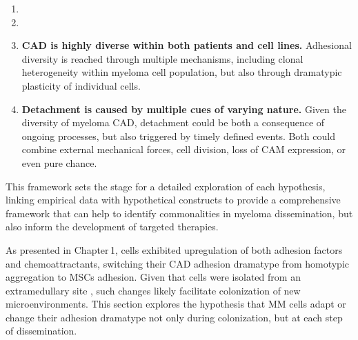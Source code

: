 \newcommand{\cadddiversity}{%
      \textbf{\ac{CAD} is highly diverse within both patients and cell lines.}
      Adhesional diversity is reached through multiple mechanisms, including
      clonal heterogeneity within myeloma cell population, but also through
      dramatypic plasticity of individual cells.%
}%
\newcommand{\cadddiversitytitle}{ %
      \textit{Hypothesis 3}: CAD is Highly Diverse Within both Patients
      and Cell Lines%
}%


\newcommand{\caddtrigger}{%
      \textbf{Detachment is caused by multiple cues of varying nature.} Given
      the diversity of myeloma \ac{CAD}, detachment could be both a consequence
      of ongoing processes, but also triggered by timely defined events. Both
      could combine external mechanical forces, cell division, loss
      of \ac{CAM} expression, or even pure chance. }%
\newcommand{\caddtriggertitle}{ %
      \textit{Hypothesis 4}: Detachment is Caused by Multiple Cues of Varying
      Nature %
}%



\begin{enumerate}[parsep=4pt]
      \item \caddramatype
      \item \cadplasticity
      \item \cadddiversity
      \item \caddtrigger
\end{enumerate}


This framework sets the stage for a detailed exploration of each hypothesis,
linking empirical data with hypothetical constructs to provide a comprehensive
framework that can help to identify commonalities in myeloma dissemination, but
also inform the development of targeted therapies.




\unnsubsection{\caddramatypetitle}%
\label{sec:discussion_caddadaptation}%
As presented in Chapter\,1, \MAina cells exhibited upregulation of both adhesion
factors and chemoattractants, switching their \ac{CAD} adhesion dramatype
from homotypic aggregation to \acp{MSC} adhesion. Given that \INA cells were
isolated from an extramedullary site 
\cite{burgerGp130RasMediated2001}, such changes likely facilitate colonization
of new microenvironments. This section explores the hypothesis that MM cells
adapt or change their adhesion dramatype not only during colonization, but at
each step of dissemination.


